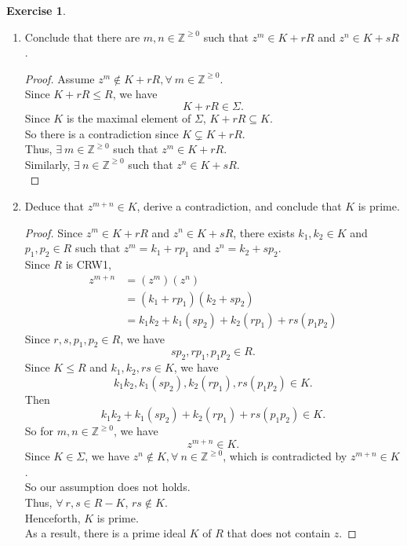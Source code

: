 \documentclass{article}
\newcommand{\bbz}{\mathbb{Z}}
\theoremstyle{plain}
\theoremstyle{definition}
\newtheorem{exer}[lem]{Exercise}
\begin{document}
\begin{exer}
\begin{enumerate}[(a)]
\begin{enumerate}[(1)]
\begin{proof}
\end{proof}
\item Conclude that there are $m,n\in\bbz^{\geq 0}$ such that $z^m\in K+rR$ and $z^n\in K+sR$.
\begin{proof}
    Assume $z^m \not\in K+rR, \forall \ m \in \bbz^{\geq 0}$.\\
    Since $K+rR \leq R$, we have 
    \[K+rR \in \Sigma.\]
    Since $K$ is the maximal element of $\Sigma$, $K+rR \subseteq K$.\\
    So there is a contradiction since $K \subsetneq K+rR$.\\
    Thus, $\exists \ m \in \bbz^{\geq 0}$ such that $z^m \in K+rR$.\\
    Similarly, $\exists \ n \in \bbz^{\geq 0}$ such that $z^n \in K+sR$.\\
\end{proof}
\item Deduce that $z^{m+n}\in K$,  derive a contradiction, and conclude that $K$ is prime.
    \begin{proof}
        Since $z^m \in K+rR$ and $z^n \in K+sR$, there exists $k_1,k_2 \in K$ and $p_1,p_2 \in R$ such that $z^m = k_1 + rp_1$ and $z^n = k_2+ sp_2$.\\
        Since $R$ is CRW1,
        \begin{align*}
            z^{m+n} &= (z^m) (z^n) \\
            &= (k_1 + rp_1)(k_2+sp_2) \\
            &=k_1k_2+k_1(sp_2) + k_2(rp_1) + rs(p_1p_2)  
        \end{align*}
        Since $r,s,p_1,p_2 \in R$, we have
        \[sp_2,rp_1,p_1p_2 \in R.\]
        Since $K \leq R$ and $k_1,k_2,rs \in K$, we have
        \[k_1k_2, k_1(sp_2), k_2(rp_1), rs(p_1p_2) \in K.\]
        Then
        \[k_1k_2+k_1(sp_2) + k_2(rp_1) + rs(p_1p_2) \in K.\]
        So for $m,n \in \bbz^{\geq 0}$, we have
        \[z^{m+n} \in K.\]
        Since $K \in \Sigma$, we have $z^n \not\in K, \forall \ n \in \bbz^{\geq 0}$, which is contradicted by $z^{m+n} \in K$.\\
        So our assumption does not holds.\\
        Thus, $\forall \ r,s\in R-K$, $rs \not\in K$.\\
        Henceforth, $K$ is prime.\\
        As a result, there is a prime ideal $K$ of $R$ that does not contain $z$.
    \end{proof}
\end{enumerate}
\end{enumerate}
\end{exer}
\end{document}

